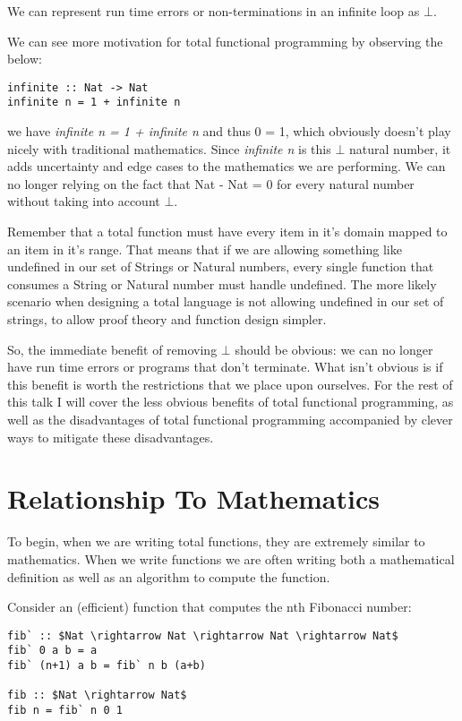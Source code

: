 \documentclass[12pt]{article}
\begin{document}
We can represent run time errors or non-terminations in an infinite loop as $\bot$.

We can see more motivation for total functional programming by observing the below:
\bigskip
\begin{lstlisting}[frame=single,mathescape=true]
infinite :: Nat -> Nat
infinite n = 1 + infinite n
\end{lstlisting}
we have \emph{infinite n = 1 + infinite n} and thus 0 = 1, which obviously doesn't play nicely with traditional mathematics. Since \emph{infinite n} is this $\bot$ natural number, it adds uncertainty and edge cases to the mathematics we are performing. We can no longer relying on the fact that Nat - Nat = 0 for every natural number without taking into account $\bot$.

Remember that a total function must have every item in it's domain mapped to an item in it's range. That means that if we are allowing something like undefined in our set of Strings or Natural numbers, every single function that consumes a String or Natural number must handle undefined. The more likely scenario when designing a total language is not allowing undefined in our set of strings, to allow proof theory and function design simpler.

So, the immediate benefit of removing $\bot$ should be obvious: we can no longer have run time errors or programs that don't terminate. What isn't obvious is if this benefit is worth the restrictions that we place upon ourselves. For the rest of this talk I will cover the less obvious benefits of total functional programming, as well as the disadvantages of total functional programming accompanied by clever ways to mitigate these disadvantages.


\section{Relationship To Mathematics}

To begin, when we are writing total functions, they are extremely similar to mathematics. When we write functions we are often writing both a mathematical definition as well as an algorithm to compute the function.

Consider an (efficient) function that computes the nth Fibonacci number:
\bigskip
\begin{lstlisting}[frame=single,mathescape=true]
fib` :: $Nat \rightarrow Nat \rightarrow Nat \rightarrow Nat$
fib` 0 a b = a
fib` (n+1) a b = fib` n b (a+b) 

fib :: $Nat \rightarrow Nat$
fib n = fib` n 0 1
\end{lstlisting}
\end{document}
